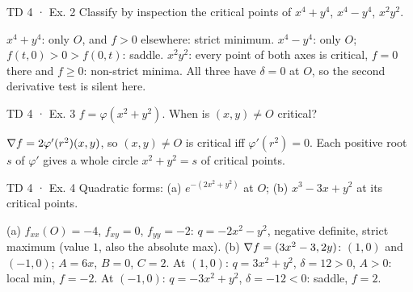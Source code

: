 \begin{problem}{TD 4 · Ex. 2}
Classify by inspection the critical points of $x^4+y^4$, $x^4-y^4$, $x^2y^2$.
\end{problem}
\begin{solution}
$x^4+y^4$: only $O$, and $f>0$ elsewhere: strict minimum. $x^4-y^4$: only $O$; $f(t,0)>0>f(0,t)$:
saddle. $x^2y^2$: every point of both axes is critical, $f=0$ there and $f\ge0$: non-strict
minima. All three have $\delta=0$ at $O$, so the second derivative test is silent here.
\end{solution}

\begin{problem}{TD 4 · Ex. 3}
$f=\varphi(x^2+y^2)$. When is $(x,y)\ne O$ critical?
\end{problem}
\begin{solution}
$\nabla f=2\varphi'(r^2)(x,y)$, so $(x,y)\ne O$ is critical iff $\varphi'(r^2)=0$. Each positive root
$s$ of $\varphi'$ gives a whole circle $x^2+y^2=s$ of critical points.
\end{solution}

\begin{problem}{TD 4 · Ex. 4}
Quadratic forms: (a) $e^{-(2x^2+y^2)}$ at $O$; (b) $x^3-3x+y^2$ at its critical points.
\end{problem}
\begin{solution}
(a) $f_{xx}(O)=-4$, $f_{xy}=0$, $f_{yy}=-2$: $q=-2x^2-y^2$, negative definite, strict maximum
(value $1$, also the absolute max).
(b) $\nabla f=(3x^2-3,2y)$: $(1,0)$ and $(-1,0)$; $A=6x$, $B=0$, $C=2$.
At $(1,0)$: $q=3x^2+y^2$, $\delta=12>0$, $A>0$: local min, $f=-2$.
At $(-1,0)$: $q=-3x^2+y^2$, $\delta=-12<0$: saddle, $f=2$.
\end{solution}


